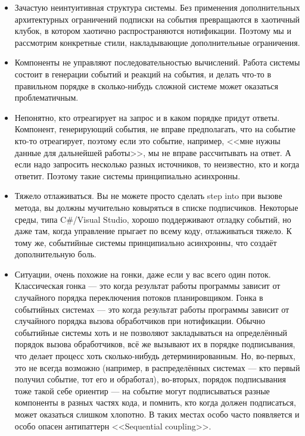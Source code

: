 \documentclass{../../text-style}
\begin{document}
\begin{itemize}
    \item Зачастую неинтуитивная структура системы. Без применения дополнительных архитектурных ограничений подписки на события превращаются в хаотичный клубок, в котором хаотично распространяются нотификации. Поэтому мы и рассмотрим конкретные стили, накладывающие дополнительные ограничения.
    \item Компоненты не управляют последовательностью вычислений. Работа системы состоит в генерации событий и реакций на события, и делать что-то в правильном порядке в сколько-нибудь сложной системе может оказаться проблематичным.
    \item Непонятно, кто отреагирует на запрос и в каком порядке придут ответы. Компонент, генерирующий события, не вправе предполагать, что на событие кто-то отреагирует, поэтому если это событие, например, <<мне нужны данные для дальнейшей работы>>, мы не вправе рассчитывать на ответ. А если надо запросить несколько разных источников, то неизвестно, кто и когда ответит. Поэтому такие системы принципиально асинхронны.
    \item Тяжело отлаживаться. Вы не можете просто сделать step into при вызове метода, вы должны мучительно ковыряться в списке подписчиков. Некоторые среды, типа C\#/Visual Studio, хорошо поддерживают отладку событий, но даже там, когда управление прыгает по всему коду, отлаживаться тяжело. К тому же, событийные системы принципиально асинхронны, что создаёт дополнительную боль.
    \item Ситуации, очень похожие на гонки, даже если у вас всего один поток. Классическая гонка --- это когда результат работы программы зависит от случайного порядка переключения потоков планировщиком. Гонка в событийных системах --- это когда результат работы программы зависит от случайного порядка вызова обработчиков при нотификации. Обычно событийные системы хоть и не позволяют закладываться на определённый порядок вызова обработчиков, всё же вызывают их в порядке подписывания, что делает процесс хоть сколько-нибудь детерминированным. Но, во-первых, это не всегда возможно (например, в распределённых системах --- кто первый получил событие, тот его и обработал), во-вторых, порядок подписывания тоже такой себе ориентир --- на событие могут подписываться разные компоненты в разных частях кода, и помнить, кто когда должен подписаться, может оказаться слишком хлопотно. В таких местах особо часто появляется и особо опасен антипаттерн <<Sequential coupling>>.
\end{itemize}
\end{document}

